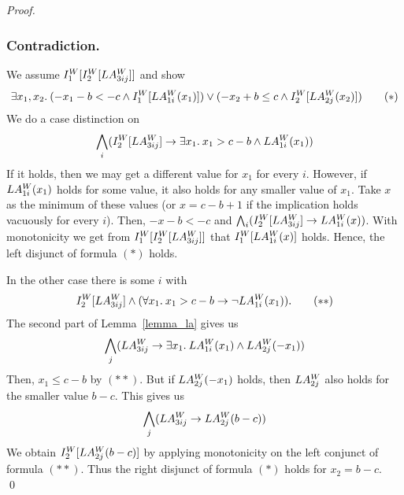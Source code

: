 \begin{techreport}
\begin{proof}
\subsubsection*{Contradiction.}
We assume $I_1^W[I_2^W[LA_{3ij}^W]]$ and show
\[
  \exists x_1,x_2.\:
  (-x_1 - b < -c \land I_1^W[LA_{1i}^W(x_1)])  \lor
  (-x_2 +  b \leq c \land I_2^W[LA_{2j}^W(x_2)]) \tag{$*$}
\]
We do a case distinction on
\[\bigwedge_i (I_2^W[LA_{3ij}^W] \rightarrow 
 \exists x_1.\: x_1 > c - b \land LA_{1i}^W(x_1))\]
%
If it holds, then we may get a different value for $x_1$ for every
$i$.  However, if $LA_{1i}^W(x_1)$ holds for some value, it also holds
for any smaller value of $x_1$.  Take $x$ as the minimum of these
values (or $x=c-b+1$ if the implication holds vacuously for every
$i$).  Then, $-x -b < -c$ and
$\bigwedge_i (I_2^W[LA_{3ij}^W] \rightarrow LA_{1i}^W(x))$.
With monotonicity we get from $I_1^W[I_2^W[LA_{3ij}^W]]$ that
$I_1^W[LA_{1i}^W(x)]$ holds. Hence, the left disjunct of formula $(*)$ holds.

In the other case there is some $i$ with
\[I_2^W[LA_{3ij}^W] \land (\forall x_1.\: x_1 > c - b \rightarrow \lnot LA_{1i}^W(x_1)). \tag{$**$}\]
The second part of Lemma~\ref{lemma_la} gives us 
\[\bigwedge_j( LA_{3ij}^W \rightarrow \exists x_1.\: LA_{1i}^W(x_1) \land LA_{2j}^W(-x_1))\]
Then, $x_1 \leq c-b$ by $(**)$.  But if $LA_{2j}^W(-x_1)$ holds, then
$LA_{2j}^W$ also holds for the smaller value $b-c$.  This gives us
\[ \bigwedge_j (LA_{3ij}^W \rightarrow LA_{2j}^W(b-c))\]
We obtain $I_2^W[LA_{2j}^W(b-c)]$ by applying monotonicity on the
left conjunct of formula $(**)$.  Thus the
right disjunct of formula $(*)$ holds for $x_2 = b-c$.
\qed
\end{proof}
\end{techreport}

